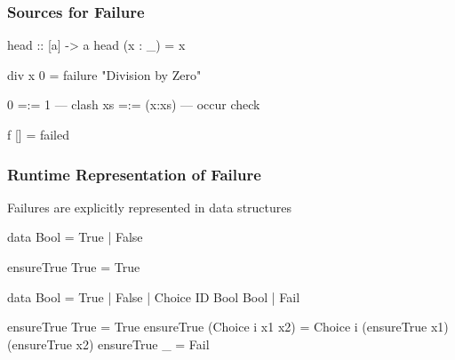 \documentclass[
,xcolor=dvipsnames
]{beamer}
\begin{document}
\begin{frame}[fragile]%
\frametitle{Sources for Failure}

\begin{curry}
head :: [a] -> a
head (x : _) = x
\end{curry}

\begin{curry}
div x 0 = failure "{}Division by Zero"
\end{curry}

\begin{curry}
0  =:= 1      --- clash
xs =:= (x:xs) --- occur check
\end{curry}

\begin{curry}
f [] = failed
\end{curry}
\end{frame}


\begin{frame}[fragile]%
\frametitle{Runtime Representation of Failure}

Failures are explicitly represented in data structures

\begin{curry}
data Bool = True | False

ensureTrue True = True
\end{curry}

\begin{haskell}
data Bool = True | False | Choice ID Bool Bool | \alert{Fail}

ensureTrue True             = True
ensureTrue (Choice i x1 x2) = Choice i (ensureTrue x1)
                                       (ensureTrue x2)
\alert{ensureTrue _                = Fail}
\end{haskell}
\end{frame}
\end{document}
